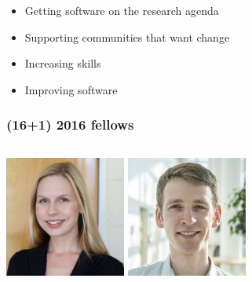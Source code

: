 \documentclass{beamer}
\begin{document}
\begin{frame}
    \begin{itemize}
            \item Getting software on the research agenda
            \item Supporting communities that want change
            \item Increasing skills
            \item Improving software
    \end{itemize}
\end{frame}

\begin{frame}
    \frametitle{(16+1) 2016 fellows}
    \begin{columns}
        \begin{column}{.2\textwidth}
            \begin{center}
                \includegraphics[width=.8\textwidth]{img/fellows/caroline-jay_thumb.png}
                \vspace{.2cm}
                \includegraphics[width=.8\textwidth]{img/fellows/craig-maclachlan_thumb.jpeg}

\end{center}
\end{column}
\end{columns}
\end{frame}
\end{document}
